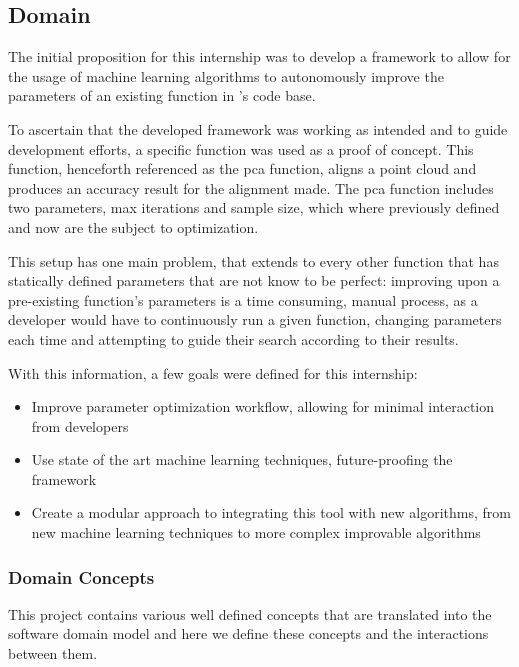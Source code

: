 
\subsection{Domain}

The initial proposition for this internship was to develop a framework to allow for the usage of machine learning algorithms to autonomously improve the parameters of an existing function in \faro's code base.

To ascertain that the developed framework was working as intended and to guide development efforts, a specific function was used as a proof of concept. This function, henceforth referenced as the \acrfull{pca} function, aligns a point cloud and produces an accuracy result for the alignment made. The \acrshort{pca} function includes two parameters, max iterations and sample size, which where previously defined and now are the subject to optimization.

This setup has one main problem, that extends to every other function that has statically defined parameters that are not know to be perfect: improving upon a pre-existing function's parameters is a time consuming, manual process, as a developer would have to continuously run a given function, changing parameters each time and attempting to guide their search according to their results.

With this information, a few goals were defined for this internship:

\begin{itemize}
	\item Improve parameter optimization workflow, allowing for minimal interaction from developers
	\item Use state of the art machine learning techniques, future-proofing the framework
	\item Create a modular approach to integrating this tool with new algorithms, from new machine learning techniques to more complex improvable algorithms
\end{itemize}

\subsubsection{Domain Concepts}

This project contains various well defined concepts that are translated into the software domain model and here we define these concepts and the interactions between them.

